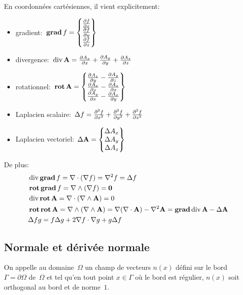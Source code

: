 \medskip
En coordonnées cartésiennes, il vient explicitement:
\begin{itemize}
  \item gradient:~$ \gradb f=
	\VV*{{\partial f \over \partial x}\\ {\partial f \over \partial y}\\ {\partial f \over \partial z}}$
  \item divergence:~$ \operatorname{div} \mathbf{A} =
	{\partial A_x \over \partial x} + {\partial A_y \over \partial y} + {\partial A_z \over \partial z}$
  \item rotationnel:~$ \rotb \mathbf{A} =
	\VV*{{\partial A_z \over \partial y} - {\partial A_y \over \partial z} \\
	{\partial A_x \over \partial z} - {\partial A_z \over \partial x} \\
	{\partial A_y \over \partial x} - {\partial A_x \over \partial y}}$
  \item Laplacien scalaire:~$\Delta f ={\partial^2 f \over \partial x^2} + {\partial^2 f \over \partial y^2} + {\partial^2 f \over \partial z^2}$
  \item Laplacien vectoriel:~$\Delta \mathbf{A} =
	\VV*{\Delta A_x \\ \Delta A_y \\ \Delta A_z}$
\end{itemize}

\medskip
De plus:
\begin{align}
&\dive \gradb f = \nabla \cdot (\nabla f) = \nabla^2 f = \Delta f\\
&\rotb\gradb f = \nabla \wedge ( \nabla f)
\colorred = \boldsymbol 0\\
&\dive\rotb \mathbf{A} = \nabla \cdot ( \nabla \wedge \mathbf{A} ) \colorred = 0\\
&\rotb\rotb\mathbf{A} = \nabla \wedge (\nabla \wedge \mathbf{A} ) =\nabla ( \nabla \cdot \mathbf{A} ) - \nabla^2 \mathbf{A} = \gradb\dive \mathbf{A} - \Delta \mathbf{A} \\
&\Delta f g = f \Delta g + 2 \nabla f \cdot \nabla g + g \Delta f
\end{align}

\medskip
\subsection{Normale et dérivée normale}

\begin{definition}[Normale]
On appelle  au domaine~$\Omega$ un champ de vecteurs
$n(x)$ défini sur le bord~$\Gamma=\partial\Omega$ de~$\Omega$ et tel qu'en tout point
$x\in\Gamma$ où le bord est régulier, $n(x)$ soit orthogonal au bord
et de norme~$1$.
\end{definition}

